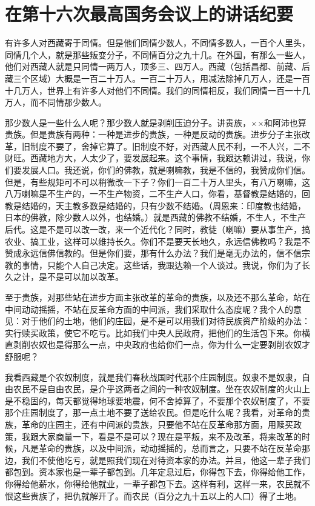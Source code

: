 \section[在第十六次最高国务会议上的讲话纪要（一九五九年四月十五日）]{在第十六次最高国务会议上的讲话纪要}


有许多人对西藏寄于同情。但是他们同情少数人，不同情多数人，一百个人里头，同情几个人，就是那些叛变分子，不同情百分之九十几。在外国，有那么一些人，他们对西藏人就是只同情一两万人，顶多三、四万人。西藏（包括昌都、前藏、后藏三个区域）大概是一百二十万人。一百二十万人，用减法除掉几万人，还是一百十几万人，世界上有许多人对他们不同情。我们的同情相反，我们同情一百一十几万人，而不同情那少数人。

那少数人是一些什么人呢？那少数人就是剥削压迫分子。讲贵族，××和阿沛也算贵族。但是贵族有两种：一种是进步的贵族，一种是反动的贵族。进步分子主张改革，旧制度不要了，舍掉它算了。旧制度不好，对西藏人民不利，一不人兴，二不财旺。西藏地方大，人太少了，要发展起来。这个事情，我跟达赖讲过，我说，你们要发展人口。我还说，你们的佛教，就是喇嘛教，我是不信的，我赞成你们信。但是，有些规矩可不可以稍微改一下子？你们一百二十万人里头，有八万喇嘛，这八万喇嘛是不生产的，一不生产物资，二不生产人口，你看，基督教是结婚的，回教是结婚的，天主教多数是结婚的，只有少数不结婚。（周恩来：印度教也结婚，日本的佛教，除少数人以外，也结婚。）就是西藏的佛教不结婚，不生人，不生产后代。这是不是可以改一改，来一个近代化？同时，教徒（喇嘛）要从事生产，搞农业、搞工业，这样可以维持长久。你们不是要天长地久，永远信佛教吗？我是不赞成永远信佛信教的。但是你们要，那有什么办法？我们是毫无办法的，信不信宗教的事情，只能个人自己决定。这些话，我跟达赖一个人谈过。我说，你们为了长久之计，是不是可以加以改革。

至于贵族，对那些站在进步方面主张改革的革命的贵族，以及还不那么革命，站在中间动动摇摇，不站在反革命方面的中间派，我们采取什么态度呢？我个人的意见：对于他们的土地，他们的庄园，是不是可以用我们对待民族资产阶级的办法：实行赎买政策，使它不吃亏。比如我们中央人民政府，把他们的生活包下来。你横直剥削农奴也是得那么一点，中央政府也给你们一点，你为什么一定要剥削农奴才舒服呢？

我看西藏是个农奴制度，就是我们春秋战国时代那个庄园制度。奴隶不是奴隶，自由农民不是自由农民，是介乎这两者之间的一种农奴制度。坐在农奴制度的火山上是不稳固的，每天都觉得地球要地震，何不舍掉算了，不要那个农奴制度了，不要那个庄园制度了，那一点土地不要了送给农民。但是吃什么呢？我看，对革命的贵族，革命的庄园主，还有中间派的贵族，只要他不站在反革命那方面，用赎买政策，我跟大家商量一下，看是不是可以？现在是平叛，来不及改革，将来改革的时候，凡是革命的贵族，以及中间派，动动摇摇的，总而言之，只要不站在反革命那边，我们不使他吃亏，就是照我们现在对待资本家的办法。并且，他这一辈子我们都包到。资本家也是一辈子都包到。几年定息过后，你得包下去，你得给他工作，你得给他薪水，你得给他就业，一辈子都包下去。这样有利，这样一来，农民就不恨这些贵族了，把仇就解开了。而农民（百分之九十五以上的人口）得了土地。

